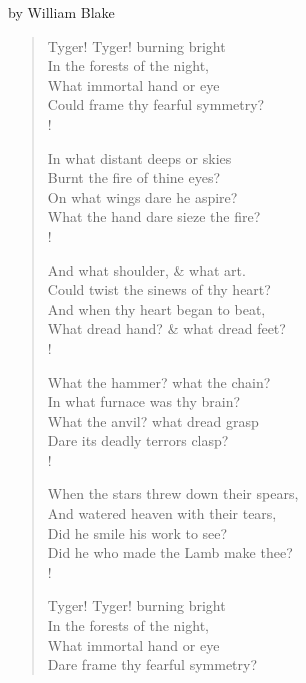 
by William Blake
\begin{verse}
Tyger! Tyger! burning bright \\
In the forests of the night, \\
What immortal hand or eye \\
Could frame thy fearful symmetry? \\!

In what distant deeps or skies \\
Burnt the fire of thine eyes? \\
On what wings dare he aspire? \\
What the hand dare sieze the fire? \\!

And what shoulder, {\&} what art. \\
Could twist the sinews of thy heart? \\
And when thy heart began to beat, \\
What dread hand? {\&} what dread feet? \\!

What the hammer? what the chain? \\
In what furnace was thy brain? \\
What the anvil? what dread grasp \\
Dare its deadly terrors clasp? \\!

When the stars threw down their spears, \\
And watered heaven with their tears, \\
Did he smile his work to see? \\
Did he who made the Lamb make thee? \\!

Tyger! Tyger! burning bright \\
In the forests of the night, \\
What immortal hand or eye \\
Dare frame thy fearful symmetry? \\
\end{verse}
